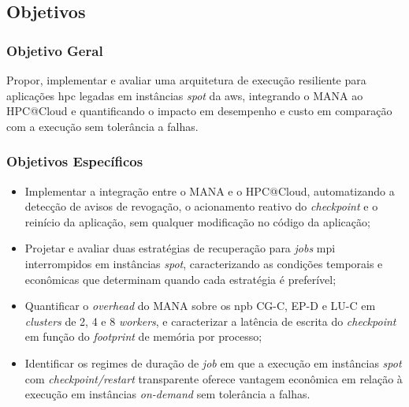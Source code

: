\documentclass[a4paper,11pt]{article}
\begin{document}
        \subsection{Objetivos}

            \subsubsection{Objetivo Geral}

                Propor, implementar e avaliar uma arquitetura de execução resiliente para
                aplicações \gls{hpc} legadas em instâncias \textit{spot} da \gls{aws}, integrando o
                MANA ao HPC@Cloud e quantificando o impacto em desempenho e custo em
                comparação com a execução sem tolerância a falhas.

            \subsubsection{Objetivos Específicos}

                \begin{itemize}
                    \item Implementar a integração entre o MANA e o HPC@Cloud,
                          automatizando a detecção de avisos de revogação, o acionamento
                          reativo do \textit{checkpoint} e o reinício da aplicação, sem
                          qualquer modificação no código da aplicação;
                    \item Projetar e avaliar duas estratégias de recuperação para
                          \textit{jobs} \gls{mpi} interrompidos em instâncias \textit{spot},
                          caracterizando as condições temporais e econômicas que
                          determinam quando cada estratégia é preferível;
                    \item Quantificar o \textit{overhead} do MANA sobre os \gls{npb}
                          CG-C, EP-D e LU-C em \textit{clusters} de 2,
                          4 e 8 \textit{workers}, e caracterizar a latência de escrita do
                          \textit{checkpoint} em função do \textit{footprint} de memória
                          por processo;
                    \item Identificar os regimes de duração de \textit{job} em que a
                          execução em instâncias \textit{spot} com \textit{checkpoint/restart}
                          transparente oferece vantagem econômica em relação à execução
                          em instâncias \textit{on-demand} sem tolerância a falhas.
                \end{itemize}
\end{document}
